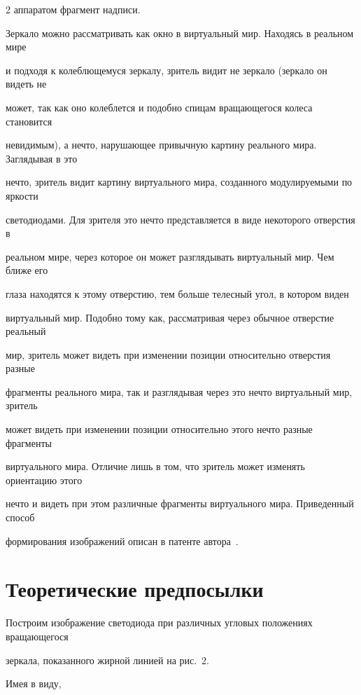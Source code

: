 \begin{multicols}{2}
аппаратом фрагмент надписи. 

  

 

  Зеркало можно рассматривать как окно в виртуальный мир. Находясь в реальном мире 

и подходя к колеблющемуся зеркалу, зритель видит не зеркало (зеркало он видеть не 

может, так как оно колеблется и подобно спицам вращающегося колеса становится 

невидимым), а нечто, нарушающее привычную картину реального мира. Заглядывая в это 

нечто, зритель видит картину виртуального мира, созданного модулируемыми по яркости 

светодиодами. Для зрителя это нечто представляется в виде некоторого отверстия в 

реальном мире, через которое он может разглядывать виртуальный мир. Чем ближе его 

глаза находятся к этому отверстию, тем больше телесный угол, в котором виден 

виртуальный мир. Подобно тому как, рассматривая через обычное отверстие реальный 

мир, зритель может видеть при изменении позиции относительно отверстия разные 

фрагменты реального мира, так и разглядывая через это нечто виртуальный мир, зритель 

может видеть при изменении позиции относительно этого нечто разные фрагменты 

виртуального мира. Отличие лишь в том, что зритель может изменять ориентацию этого 

нечто и видеть при этом различные фрагменты виртуального мира. Приведенный способ 

формирования изображений описан в патенте автора~\cite{1t}. 



\section{Теоретические предпосылки}



  Построим изображение светодиода при различных угловых положениях вращающегося 

зеркала, показанного жирной линией на рис.~2. %

Имея в виду,\columnbreak




\end{multicols}
